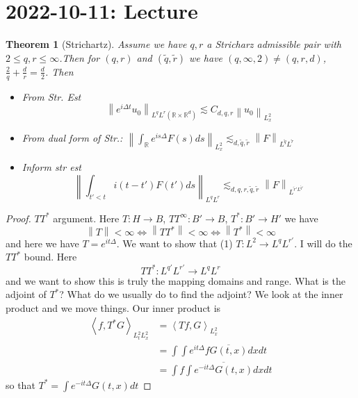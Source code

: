 \documentclass{article}
\newtheorem{theorem}{Theorem}
\def\R{\mathbb{R}} %
\newcommand\norm[1]{\left\lVert#1\right\rVert}
\begin{document}
\section{2022-10-11: Lecture}
\begin{theorem}[Strichartz] \label{thm:strichartz}
  Assume we have $q,r$ a Stricharz admissible pair with $2 \leq q,r \leq
  \infty$.Then for $(q,r)$ and $(\tilde{q},\tilde{r})$ we have $(q,\infty,2)
  \neq (q,r,d)$, $\frac{2}{q}+\frac{d}{r}=\frac{d}{2}$. Then
  \begin{itemize}
    \item From Str. Est
    \begin{equation*}
      \norm{e^{i\Delta t}u_{0}}_{L^{q}L^{r}(\R\times \R^{d})}\lesssim C_{d,q,r} \norm{u_{0}}_{L^{2}_{x}}
    \end{equation*}
    \item From dual form of Str.: $\norm{\int_{\R}e^{is\Delta}F(s)ds
    }_{L^{2}_{x}}\lesssim_{d,\tilde{q},\tilde{r}}\norm{F}_{L^{\tilde{q}}L^{\tilde{r}}}$
    \item Inform str est
    \begin{equation*}
      \norm{\int_{t'<t}i(t-t')F(t')ds }_{L^{q}L^{r}}\lesssim_{d,q,r,\tilde{q},\tilde{r}}\norm{F}_{L^{\tilde{r}'L^{\tilde{q}'}}}
    \end{equation*}
  \end{itemize}
\end{theorem}
\begin{proof}
  $TT^{*}$ argument. Here $T:H \to B$,  $TT^{\infty}:B' \to B$,  $T^{*}:B' \to
  H'$ we have
  \begin{equation*}
    \norm{T}<\infty \iff \norm{TT^{*}}<\infty \iff \norm{T^{*}}<\infty
  \end{equation*}
  and here we have $T=e^{it\Delta}$.  We want to show that (1) $T:L^{2} \to
  L^{q}L^{r'}$. I will do the $TT^{*}$ bound. Here
  \begin{equation*}
    TT^{*}:L^{q'}L^{r'} \to L^{q}L^{r}
  \end{equation*}
  and we want to show this is truly the mapping domains and range. What is the
  adjoint of $T^{*}$? What do we usually do to find the adjoint? We look at the
  inner product and we move things. Our inner product is
  \begin{align*}
    \left\langle f,T^{*}G \right\rangle_{L_{t}^{2}L_{x}^{2}}
    &=\left\langle Tf,G \right\rangle_{L_{x}^{2}}\\
    &= \int \int e^{it\Delta}f\overline{G(t,x)}dxdt\\ 
    &= \int f \int \overline{e^{-it\Delta}G(t,x)}dxdt
  \end{align*}
  so that $T^{*} = \int e^{-it \Delta }G(t,x)dt $
\end{proof}
\end{document}
